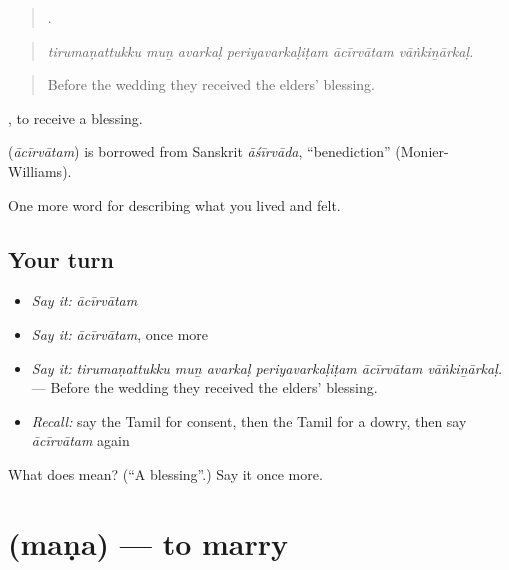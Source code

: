 \begin{quote}
     .
\end{quote}

\begin{quote}
\emph{tirumaṇattukku muṉ avarkaḷ periyavarkaḷiṭam ācīrvātam vāṅkiṉārkaḷ.}
\end{quote}

\begin{quote}
Before the wedding they received the elders’ blessing.
\end{quote}

 , to receive a blessing.

\begin{cousinweb}
\textbf{} (\emph{ācīrvātam}) is borrowed from Sanskrit \emph{āśīrvāda}, \textquotedblleft{}benediction\textquotedblright{} (Monier-Williams).
\end{cousinweb}

\begin{grammarlens}[title={What you've built}]
One more word for describing what you lived and felt.
\end{grammarlens}

\subsection*{Your turn}
\begin{itemize}
\raggedright
  \item \emph{Say it:} \emph{ācīrvātam}
  \item \emph{Say it:} \emph{ācīrvātam}, once more
  \item \emph{Say it:} \emph{tirumaṇattukku muṉ avarkaḷ periyavarkaḷiṭam ācīrvātam vāṅkiṉārkaḷ.} — Before the wedding they received the elders’ blessing.
  \item \emph{Recall:} say the Tamil for consent, then the Tamil for a dowry, then say \emph{ācīrvātam} again
\end{itemize}

\begin{tcolorbox}[breakable,colback=teal!4,colframe=teal!35!black,title={Before you move on}]
What does  mean? (\textquotedblleft{}A blessing\textquotedblright{}.) Say it once more.
\end{tcolorbox}
\section[\texorpdfstring{\ta{மண} (maṇa)}{மண (maṇa)}]{ (maṇa) — to marry}


